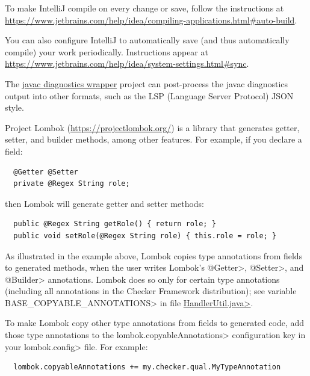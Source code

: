 To make IntelliJ compile on every change or save,
follow the instructions at
\url{https://www.jetbrains.com/help/idea/compiling-applications.html#auto-build}.

You can also configure IntelliJ to automatically save (and thus
automatically compile) your work periodically. Instructions appear at
\url{https://www.jetbrains.com/help/idea/system-settings.html#sync}.


The \href{https://github.com/eisopux/javac-diagnostics-wrapper}{javac
diagnostics wrapper} project can post-process the javac
diagnostics output into other formats, such as
the LSP (Language Server Protocol) JSON style.



Project Lombok (\url{https://projectlombok.org/}) is a library that
generates getter, setter, and builder methods, among other features.
For example, if you declare
a field:

\begin{Verbatim}
  @Getter @Setter
  private @Regex String role;
\end{Verbatim}

\noindent
then Lombok will generate getter and setter methods:

\begin{Verbatim}
  public @Regex String getRole() { return role; }
  public void setRole(@Regex String role) { this.role = role; }
\end{Verbatim}



As illustrated in the example above, Lombok copies type annotations from fields
to generated methods, when the user writes Lombok's \<@Getter>, \<@Setter>,
and \<@Builder> annotations.  Lombok does so only for certain type
annotations (including all annotations in the Checker Framework
distribution); see variable \<BASE\_COPYABLE\_ANNOTATIONS> in file
\href{https://github.com/projectlombok/lombok/blob/master/src/core/lombok/core/handlers/HandlerUtil.java}{\<HandlerUtil.java>}.

To make Lombok copy other type annotations from fields to generated code,
add those type annotations to the \<lombok.copyableAnnotations>
configuration key in your \<lombok.config> file.  For example:

\begin{Verbatim}
  lombok.copyableAnnotations += my.checker.qual.MyTypeAnnotation
\end{Verbatim}

